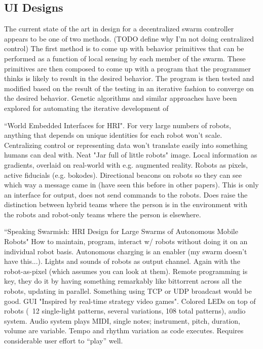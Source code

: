 \documentclass[]{article}
\begin{document}
\subsection{UI Designs}

The current state of the art in design for a decentralized swarm controller appears to be one of two methods. (TODO define why I'm not doing centralized control)
The first method is to come up with behavior primitives that can be performed as a function of local sensing by each member of the swarm. 
These primitives are then composed to come up with a program that the programmer thinks is likely to result in the desired behavior. 
The program is then tested and modified based on the result of the testing in an iterative fashion to converge on the desired behavior. 
Genetic algorithms and similar approaches have been explored for automating the iterative development of 


``World Embedded Interfaces for HRI". \cite{Daily:2003:WEI:820752.821587} 
 For very large numbers of robots, anything that depends on unique identities for each robot won't scale. Centralizing control or representing data won't translate easily into something humans can deal with. Neat "Jar full of little robots" image. Local information as gradients, overlaid on real-world with e.g. augmented reality. Robots as pixels, active fiducials (e.g. bokodes). Directional beacons on robots so they can see which way a message came in (have seen this before in other papers). This is only an interface for output, does not send commands to the robots. Does raise the distinction between hybrid teams where the person is in the environment with the robots and robot-only teams where the person is elsewhere. 

``Speaking Swarmish: HRI Design for Large Swarms of Autonomous Mobile Robots" \cite{mclurkin2006speaking} How to maintain, program, interact w/ robots without doing it on an individual robot basis. Autonomous charging is an enabler (my swarm doesn't have this...). Lights and sounds of robots as output channel. Again with the robot-as-pixel (which assumes you can look at them). Remote programming is key, they do it by having something remarkably like bittorrent across all the robots, updating in parallel. Something using TCP or UDP broadcast would be good. GUI "Inspired by real-time strategy video games". Colored LEDs on top of robots (~12 single-light patterns, several variations, 108 total patterns), audio system. Audio system plays MIDI, single notes; instrument, pitch, duration, volume are variable. Tempo and rhythm variation as code executes. Requires considerable user effort to ``play'' well. 
\end{document}
